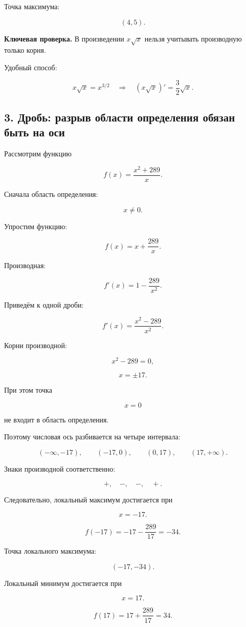 \documentclass[a4paper,12pt]{article}
\begin{document}
Точка максимума:

\[
(4,5).
\]

\textbf{Ключевая проверка.}
В произведении \(x\sqrt{x}\) нельзя учитывать производную только корня.

Удобный способ:

\[
x\sqrt{x}=x^{3/2}
\quad\Longrightarrow\quad
(x\sqrt{x})'
=
\frac32\sqrt{x}.
\]

\subsection*{3. Дробь: разрыв области определения обязан быть на оси}

Рассмотрим функцию

\[
f(x)
=
\frac{x^2+289}{x}.
\]

Сначала область определения:

\[
x\ne0.
\]

Упростим функцию:

\[
f(x)
=
x+\frac{289}{x}.
\]

Производная:

\[
f'(x)
=
1-\frac{289}{x^2}.
\]

Приведём к одной дроби:

\[
f'(x)
=
\frac{x^2-289}{x^2}.
\]

Корни производной:

\[
x^2-289=0,
\]

\[
x=\pm17.
\]

При этом точка

\[
x=0
\]

не входит в область определения.

Поэтому числовая ось разбивается на четыре интервала:

\[
(-\infty,-17),
\qquad
(-17,0),
\qquad
(0,17),
\qquad
(17,+\infty).
\]

Знаки производной соответственно:

\[
+,\quad -,\quad -,\quad +.
\]

Следовательно, локальный максимум достигается при

\[
x=-17.
\]

\[
f(-17)
=
-17-\frac{289}{17}
=
-34.
\]

Точка локального максимума:

\[
(-17,-34).
\]

Локальный минимум достигается при

\[
x=17.
\]

\[
f(17)
=
17+\frac{289}{17}
=
34.
\]
\end{document}
